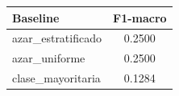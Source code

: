 \begin{tabular}{lc}
\toprule
Baseline & F1-macro \\
\midrule
azar\_estratificado & 0.2500 \\
azar\_uniforme & 0.2500 \\
clase\_mayoritaria & 0.1284 \\
\bottomrule
\end{tabular}
